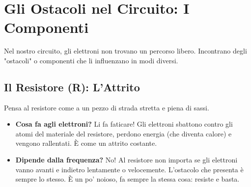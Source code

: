 \documentclass[a4paper, 11pt]{article}
\begin{document}
\section*{Gli Ostacoli nel Circuito: I Componenti}

Nel nostro circuito, gli elettroni non trovano un percorso libero. Incontrano degli "ostacoli" o componenti che li influenzano in modi diversi.

\subsection*{Il Resistore (R): L'Attrito}
Pensa al resistore come a un pezzo di strada stretta e piena di sassi.
\begin{itemize}
    \item \textbf{Cosa fa agli elettroni?} Li fa faticare! Gli elettroni sbattono contro gli atomi del materiale del resistore, perdono energia (che diventa calore) e vengono rallentati. È come un attrito costante.
    \item \textbf{Dipende dalla frequenza?} No! Al resistore non importa se gli elettroni vanno avanti e indietro lentamente o velocemente. L'ostacolo che presenta è sempre lo stesso. È un po' noioso, fa sempre la stessa cosa: resiste e basta.
\end{itemize}
\end{document}
